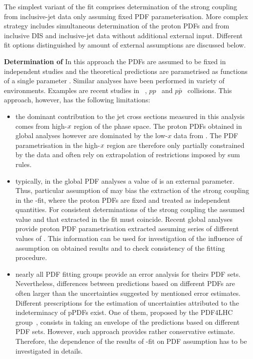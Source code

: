 The simplest variant of the fit comprises determination of the strong coupling from inclusive-jet data only assuming fixed PDF parameterisation. More complex strategy includes simultaneous determination of the proton PDFs and \asz from inclusive DIS and inclusive-jet data without additional external input. Different fit options distinguished by amount of external assumptions are discussed below.
 
{\flushleft \textbf{Determination of \asz}}\newline
In this approach the PDFs are assumed to be fixed in independent studies and the theoretical predictions are parametrised as functions of a single parameter \asz. Similar analyses have been performed in variety of environments. Examples are recent studies in \ep~\cite{}, $pp$~\cite{} and $p\bar{p}$~\cite{} collisions. This approach, however, has the following limitations:
\begin{itemize}
 \item the dominant contribution to the jet cross sections measured in this analysis comes from high-$\mbox{${x}$}$ region of the phase space. The proton PDFs obtained in global analyses however are dominated by the low-$x$ data from \hera. The PDF parametrisation in the high-$\mbox{${x}$}$ region are therefore only partially constrained by the data and often rely on extrapolation of restrictions imposed by sum rules.
 \item typically, in the global PDF analyses a value of \asz is an external parameter. Thus, particular assumption of \asz may bias the extraction of the strong coupling in the \as-fit, where the proton PDFs are fixed and treated as independent quantities. For consistent determinations of the strong coupling the assumed value and that extracted in the fit must coincide. Recent global analyses provide proton PDF parametrisation extracted assuming series of different values of \asz. This information can be used for investigation of the influence of \asz assumption on obtained results and to check consistency of the fitting procedure.
 \item nearly all PDF fitting groups provide an error analysis for theirs PDF sets. Nevertheless, differences between predictions based on different PDFs are often larger than the uncertainties suggested by mentioned error estimates. Different prescriptions for the estimation of uncertainties attributed to the indeterminacy of pPDFs exist. One of them, proposed by the PDF4LHC group~\cite{pdf4lhc:2011}, consists in taking an envelope of the predictions based on different PDF sets. However, such approach provides rather conservative estimate. Therefore, the dependence of the results of \as-fit on PDF assumption has to be investigated in details.
\end{itemize}

